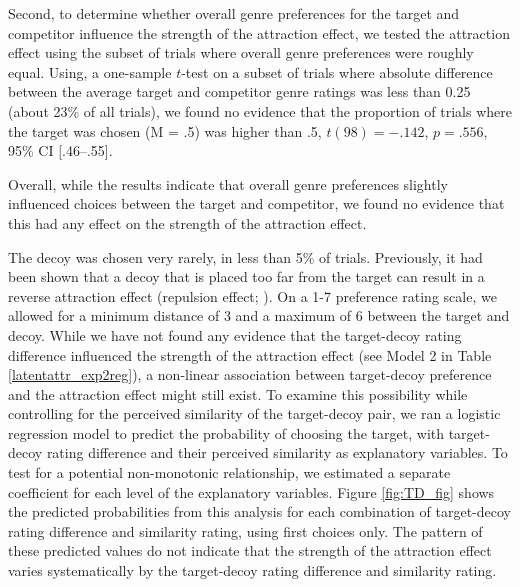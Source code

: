 \documentclass[12pt, a4paper]{article}
\begin{document}
Second, to determine whether overall genre preferences for the target and competitor influence the strength of the attraction effect, we tested the attraction effect using the subset of trials where overall genre preferences were roughly equal. Using, a one-sample $t$-test on a subset of trials where absolute difference between the average target and competitor genre ratings was less than 0.25 (about 23\% of all trials), we found no evidence that the proportion of trials where the target was chosen (M = .5) was higher than .5, $t(98)=-.142$, $p=.556$, 95\% CI [.46--.55].
  
Overall, while the results indicate that overall genre preferences slightly influenced choices between the target and competitor, we found no evidence that this had any effect on the strength of the attraction effect.

The decoy was chosen very rarely, in less than 5\% of trials. Previously, it had been shown that a decoy that is placed too far from the target can result in a reverse attraction effect (repulsion effect; ). On a 1-7 preference rating scale, we allowed for a minimum distance of 3 and a maximum of 6 between the target and decoy. While we have not found any evidence that the target-decoy rating difference influenced the strength of the attraction effect (see Model 2 in Table \ref{latentattr_exp2reg}), a non-linear association between target-decoy preference and the attraction effect might still exist. To examine this possibility while controlling for the perceived similarity of the target-decoy pair, we ran a logistic regression model to predict the probability of choosing the target, with target-decoy rating difference and their perceived similarity as explanatory variables. To test for a potential non-monotonic relationship, we estimated a separate coefficient for each level of the explanatory variables. Figure \ref{fig:TD_fig} shows the predicted probabilities from this analysis for each combination of target-decoy rating difference and similarity rating, using first choices only. The pattern of these predicted values do not indicate that the strength of the attraction effect varies systematically by the target-decoy rating difference and similarity rating.
\end{document}
